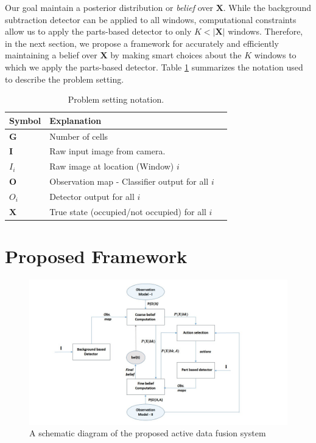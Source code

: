 \documentclass[10pt,twocolumn,letterpaper]{article}
\begin{document}
Our goal maintain a posterior distribution or \emph{belief} over $\mathbf{X}$.  While the background subtraction detector can be applied to all windows, computational constraints allow us to apply the parts-based detector to only $K < |\mathbf{X}|$ windows.  Therefore, in the next section, we propose a framework for accurately and efficiently maintaining a belief over $\mathbf{X}$ by making smart choices about the $K$ windows to which we apply the parts-based detector.  Table \ref{tab:Formal symbols} summarizes the notation used to describe the problem setting.

\begin{table}[ht] 
  \begin{tabular}{lll}
   \hline
   Symbol & Explanation \\
   \hline
   $\textbf{G} $ & Number of cells\\
   $ \textbf{I} $ & Raw input image from camera.\\
   $ I_{i} $ & Raw image at location (Window) $ i$\\
   $ \textbf{O} $ & Observation map - Classifier output for all  $ i $\\
   $O_{i} $& Detector output for all $ i $\\
   $\textbf{X}$& True state (occupied/not occupied) for all $i$\\
   \hline
  \end{tabular}
  \caption{%
    Problem setting notation. 
  }
  \label{tab:Formal symbols}
\end{table}

\section{Proposed Framework}

\begin{figure}
\begin{center}
\includegraphics[width=12cm]{img/newBlockdia.jpg}
\end{center}
   \caption{A schematic diagram of the proposed active data fusion system}
\label{fig:Block dia}
\end{figure}
\end{document}
